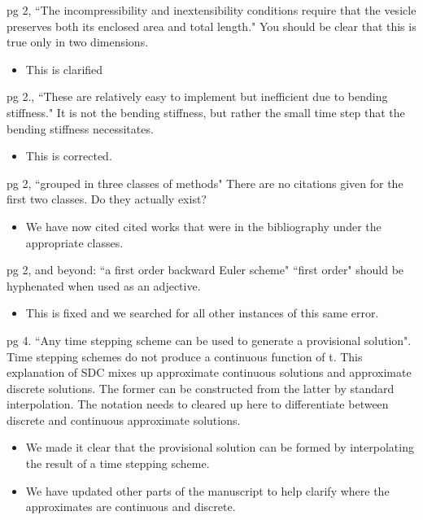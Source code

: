 \documentclass[12pt]{article}
\newcommand{\comment}[1]{{\color{blue} #1}}
\begin{document}
\comment{pg 2, ``The incompressibility and inextensibility conditions
require that the vesicle preserves both its enclosed area and total
length." You should be clear that this is true only in two dimensions.}
\begin{itemize}
  \item This is clarified
\end{itemize}

\comment{pg 2., ``These are relatively easy to implement but inefficient
due to bending stiffness." It is not the bending stiffness, but rather
the small time step that the bending stiffness necessitates.}
\begin{itemize}
  \item This is corrected.
\end{itemize}

\comment{pg 2, ``grouped in three classes of methods" There are no
citations given for the first two classes. Do they actually exist?}
\begin{itemize}
  \item We have now cited cited works that were in the bibliography
  under the appropriate classes.
\end{itemize}

\comment{pg 2, and beyond: ``a first order backward Euler scheme"
``first order" should be hyphenated when used as an adjective.}
\begin{itemize}
  \item This is fixed and we searched for all other instances of this
  same error.
\end{itemize}

\comment{pg 4. ``Any time stepping scheme can be used to generate a
provisional solution".  Time stepping schemes do not produce a
continuous function of t.  This explanation of SDC mixes up approximate
continuous solutions and approximate discrete solutions.  The former can
be constructed from the latter by standard interpolation.  The notation
needs to cleared up here to differentiate between discrete and
continuous approximate solutions.}
\begin{itemize}
  \item We made it clear that the provisional solution can be formed by
  interpolating the result of a time stepping scheme.
  \item We have updated other parts of the manuscript to help clarify
  where the approximates are continuous and discrete.
\end{itemize}
\end{document}
